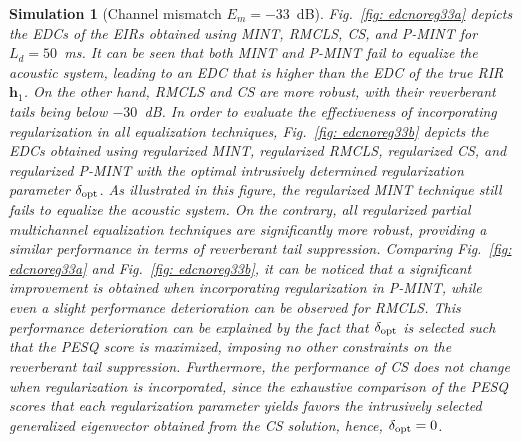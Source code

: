 \documentclass[10pt]{IEEEtran}
\newtheorem{simulation}{Simulation}
\begin{document}
\begin{simulation}[Channel mismatch $E_m=-33$~dB]
\label{sim1} 
Fig.~\ref{fig: edcnoreg33a} depicts the EDCs of the EIRs obtained using MINT, RMCLS, CS, and P-MINT for $L_d = 50$~ms.
It can be seen that both MINT and P-MINT fail to equalize the acoustic system, leading to an EDC that is higher than the EDC of the true RIR $\mathbf{h}_1$.
On the other hand, RMCLS and CS are more robust, with their reverberant tails being below $-30$~dB.
In order to evaluate the effectiveness of incorporating regularization in all equalization techniques, Fig.~\ref{fig: edcnoreg33b} depicts the EDCs obtained using regularized MINT, regularized RMCLS, regularized CS, and regularized P-MINT with the optimal intrusively determined regularization parameter $\delta_{\rm opt}$.
As illustrated in this figure, the regularized MINT technique still fails to equalize the acoustic system.
On the contrary, all regularized partial multichannel equalization techniques are significantly more robust, providing a similar performance in terms of reverberant tail suppression.
Comparing Fig.~\ref{fig: edcnoreg33a} and Fig.~\ref{fig: edcnoreg33b}, it can be noticed that a significant improvement is obtained when incorporating regularization in P-MINT, while even a slight performance deterioration can be observed for RMCLS.
This performance deterioration can be explained by the fact that $\delta_{\rm opt}$ is selected such that the PESQ score is maximized, imposing no other constraints on the reverberant tail suppression.
Furthermore, the performance of CS does not change when regularization is incorporated, since the exhaustive comparison of the PESQ scores that each regularization parameter yields favors the intrusively selected generalized eigenvector obtained from the CS solution, hence, $\delta_{\rm opt} = 0$.



\end{simulation}
\end{document}
